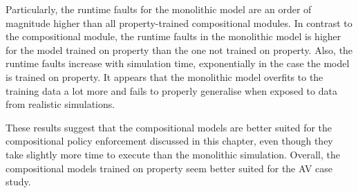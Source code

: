 Particularly, the runtime faults for the monolithic model are an order of magnitude higher than all property-trained compositional modules. In contrast to the compositional module, the runtime faults in the monolithic model is higher for the model trained on property than the one not trained on property. Also, the runtime faults increase with simulation time, exponentially in the case the model is trained on property. It appears that the monolithic model overfits to the training data a lot more and fails to properly generalise when exposed to data from realistic simulations.

These results suggest that the compositional models are better suited for the compositional policy enforcement discussed in this chapter, even though they take slightly more time to execute than the monolithic simulation. Overall, the compositional models trained on property seem better suited for the AV case study.


